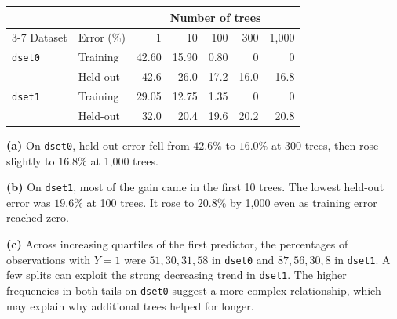 \documentclass[11pt,letterpaper]{article}
\newcommand{\parttag}[1]{\textbf{(#1)}\enspace}
\begin{document}
\begin{center}
\small
\begin{tabular}{@{}llrrrrr@{}}
\toprule
& & \multicolumn{5}{c}{Number of trees} \\
\cmidrule(l){3-7}
Dataset & Error (\%) & 1 & 10 & 100 & 300 & 1,000 \\
\midrule
\texttt{dset0} & Training & 42.60 & 15.90 & 0.80 & 0 & 0 \\
               & Held-out & 42.6 & 26.0 & 17.2 & 16.0 & 16.8 \\
\addlinespace[2pt]
\texttt{dset1} & Training & 29.05 & 12.75 & 1.35 & 0 & 0 \\
               & Held-out & 32.0 & 20.4 & 19.6 & 20.2 & 20.8 \\
\bottomrule
\end{tabular}
\end{center}

\parttag{a} On \texttt{dset0}, held-out error fell from \(42.6\%\) to \(16.0\%\) at 300 trees, then rose slightly to \(16.8\%\) at 1,000 trees.

\parttag{b} On \texttt{dset1}, most of the gain came in the first 10 trees. The lowest held-out error was \(19.6\%\) at 100 trees. It rose to \(20.8\%\) by 1,000 even as training error reached zero.

\parttag{c} Across increasing quartiles of the first predictor, the percentages of observations with \(Y=1\) were \(51, 30, 31, 58\) in \texttt{dset0} and \(87, 56, 30, 8\) in \texttt{dset1}. A few splits can exploit the strong decreasing trend in \texttt{dset1}. The higher frequencies in both tails on \texttt{dset0} suggest a more complex relationship, which may explain why additional trees helped for longer.
\end{document}
